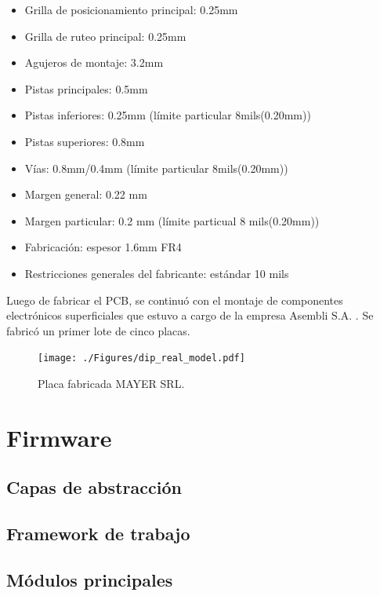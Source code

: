 \begin{itemize}

\item Grilla de posicionamiento principal: 0.25mm
\item Grilla de ruteo principal: 0.25mm
\item Agujeros de montaje: 3.2mm
\item Pistas principales: 0.5mm
\item Pistas inferiores: 0.25mm (límite particular 8mils(0.20mm))
\item Pistas superiores: 0.8mm
\item Vías: 0.8mm/0.4mm (límite particular 8mils(0.20mm))
\item Margen general: 0.22 mm
\item Margen particular: 0.2 mm (límite particual 8 mils(0.20mm))
\item Fabricación: espesor 1.6mm FR4  
\item Restricciones generales del fabricante: estándar 10 mils

\end{itemize}

Luego de fabricar el PCB, se continuó con el montaje de componentes electrónicos superficiales que estuvo a cargo de la empresa Asembli S.A. \citep{web_asembli}. Se fabricó un primer lote de cinco placas.


\begin{figure}[htbp]
	\centering
	\texttt{[image: ./Figures/dip\_real\_model.pdf]}
	\caption{Placa fabricada MAYER SRL.}
	\label{fig:dip_real_model}
\end{figure}


\section{Firmware}

\subsection{Capas de abstracción}
\subsection{Framework de trabajo}
\subsection{Módulos principales}



